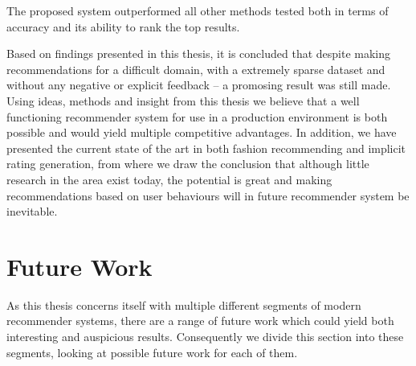 The proposed system outperformed all other methods tested both in terms of
accuracy and its ability to rank the top results.

Based on findings presented in this thesis, it is concluded that despite making
recommendations for a difficult domain, with a extremely sparse dataset and
without any negative or explicit feedback -- a promosing result was still made.
Using ideas, methods and insight from this thesis we believe that a well
functioning recommender system for use in a production environment is both
possible and would yield multiple competitive advantages. In addition, we have
presented the current state of the art in both fashion recommending and
implicit rating generation, from where we draw the conclusion that although
little research in the area exist today, the potential is great and making
recommendations based on user behaviours will in future recommender system be
inevitable.

%

\section{Future Work}

As this thesis concerns itself with multiple different segments of modern
recommender systems, there are a range of future work which could yield
both interesting and auspicious results. Consequently we divide this section
into these segments, looking at possible future work for each of them.

